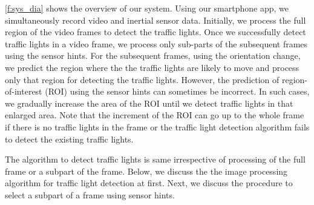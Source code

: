 \ref{f:sys_dia} shows the overview of our system.
Using our smartphone app, we simultaneously record video and inertial sensor data.
Initially, we process the full region of the video frames to detect the traffic lights.
Once we successfully detect traffic lights in a video frame, we process only sub-parts of the subsequent frames using the sensor hints. 
For the subsequent frames, using the orientation change, we predict the region where the the traffic lights are likely to move and process only that region for detecting the traffic lights.
However, the prediction of region-of-interest (ROI) using the sensor hints can sometimes be incorrect.
In such cases, we gradually increase the area of the ROI until we detect traffic lights in that enlarged area. 
Note that the increment of the ROI can go up to the whole frame if there is no traffic lights in the frame or the traffic light detection algorithm fails to detect the existing traffic lights. 

The algorithm to detect traffic lights is same irrespective of processing of the full frame or a subpart of the frame.
Below, we discuss the the image processing algorithm for traffic light detection at first. 
Next, we discuss the procedure to select a subpart of a frame using sensor hints.





